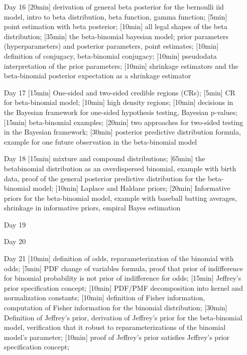 \begin{enumerate}
\item[Day 16] [20min] derivation of general beta posterior for the bernoulli iid model, intro to beta distribution, beta function, gamma function; [5min] point estimation with beta posterior; [10min] all legal shapes of the beta distribution; [35min] the beta-binomial bayesian model; prior parameters (hyperparameters) and posterior parameters, point estimates; [10min] definition of conjugacy, beta-binomial conjugacy; [10min] pseudodata interpretation of the prior parameters; [10min] shrinkage estimators and the beta-binomial posterior expectation as a shrinkage estimator

\item[Day 17] [15min] One-sided and two-sided credible regions (CRs); [5min] CR for beta-binomial model; [10min] high density regions; [10min] decisions in the Bayesian framework for one-sided hypothesis testing, Bayesian p-values; [15min] beta-binomial examples; [20min] two approaches for two-sided testing in the Bayesian framework; [30min] posterior predictive distribution formula, example for one future observation in the beta-binomial model

\item[Day 18] [15min] mixture and compound distributions;  [65min] the betabinomial distribution as an overdispersed binomial, example with birth data, proof of the general posterior predictive distribution for the beta-binomial model; [10min] Laplace and Haldane priors; [20min] Informative priors for the beta-binomial model, example with baseball batting averages, shrinkage in informative priors, empiral Bayes estimation

\item[Day 19] 
\item[Day 20] 

\item[Day 21]  [10min] definition of odds, reparameterization of the binomial with odds; [5min] PDF change of variables formula, proof that prior of indifference for binomial probability is not prior of indifference for odds; [15min] Jeffrey's prior specification concept; [10min] PDF/PMF decomposition into kernel and normalization constants; [10min] definition of Fisher information, computation of Fisher information for the binomial distribution; [30min] Definition of Jeffrey's prior, derivation of Jeffrey's prior for the beta-binomial model, verification that it robust to reparameterizations of the binomial model's parameter; [10min] proof of Jeffrey's prior satisfies  Jeffrey's prior specification concept;



\end{enumerate}

